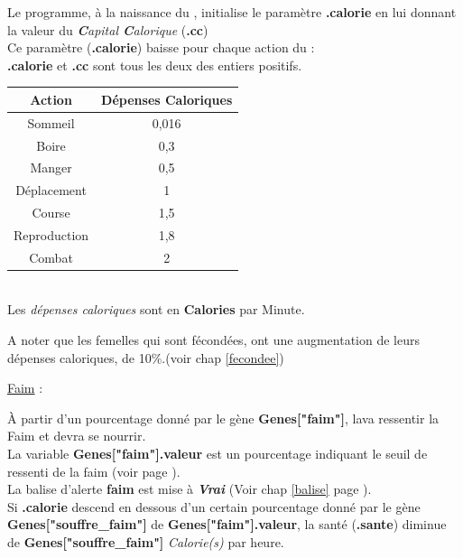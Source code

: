 \documentclass[french]{report}
\begin{document}
Le programme, à la naissance du \CoCiX, initialise le paramètre \textbf{.calorie} en lui donnant la valeur du \textit{\textbf{C}apital \textbf{C}alorique} (\textbf{.cc})\\

Ce paramètre (\textbf{.calorie}) baisse pour chaque action du \CoCiX  :\\
\textbf{.calorie} et \textbf{.cc} sont tous les deux des entiers positifs.

\begin{center}\label{depense_calorique}
\begin{tabular}{|c|c|}\hline
\rowcolor{yellow}\textbf{Action} & \textbf{Dépenses Caloriques}\\ \hline
Sommeil & 0,016 \\ \hline
Boire & 0,3 \\ \hline
Manger  & 0,5 \\ \hline
Déplacement & 1 \\ \hline
Course & 1,5 \\ \hline
Reproduction & 1,8 \\ \hline
Combat & 2 \\ \hline
\end{tabular}\\[0.5cm]

Les \textit{dépenses caloriques} sont en \textbf{Calories} par Minute.

\end{center}

A noter que les femelles qui sont fécondées, ont une augmentation de leurs dépenses caloriques, de 10\%.(voir chap \ref{fecondee})\\
\begin{center}
	\underline{Faim} :\label{faim}
\end{center}
À partir d'un pourcentage donné par le gène \textbf{Genes["faim"]}, la\CoCiX va  ressentir la Faim et devra se nourrir.\\

La variable \textbf{Genes["faim"].valeur} est un pourcentage indiquant le seuil de ressenti de la faim (voir page \pageref{liste_gene}).\\
La balise d'alerte \textbf{faim} est mise à \textbf{\textit{Vrai}} (Voir chap \ref{balise} page \pageref{balise}).\\

Si \textbf{.calorie} descend en dessous d'un certain pourcentage donné par le gène \textbf{Genes["souffre\_faim"]} de \textbf{Genes["faim"].valeur}, la santé (\textbf{.sante}) diminue de \textbf{Genes["souffre\_faim"]} \textit{Calorie(s)} par heure.\\
\end{document}
